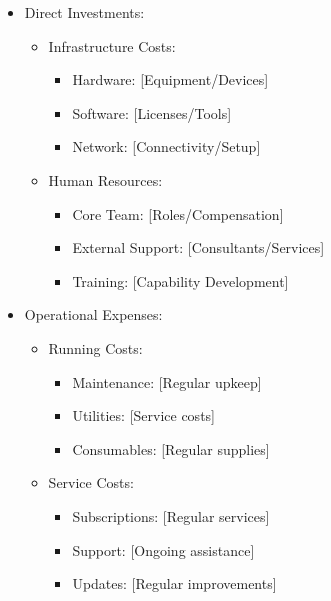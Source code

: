 \documentclass{article}
\begin{document}
\begin{itemize}
    \item Direct Investments:
    \begin{itemize}
        \item Infrastructure Costs:
        \begin{itemize}
            \item Hardware: [Equipment/Devices]
            \item Software: [Licenses/Tools]
            \item Network: [Connectivity/Setup]
        \end{itemize}
        \item Human Resources:
        \begin{itemize}
            \item Core Team: [Roles/Compensation]
            \item External Support: [Consultants/Services]
            \item Training: [Capability Development]
        \end{itemize}
    \end{itemize}
    \item Operational Expenses:
    \begin{itemize}
        \item Running Costs:
        \begin{itemize}
            \item Maintenance: [Regular upkeep]
            \item Utilities: [Service costs]
            \item Consumables: [Regular supplies]
        \end{itemize}
        \item Service Costs:
        \begin{itemize}
            \item Subscriptions: [Regular services]
            \item Support: [Ongoing assistance]
            \item Updates: [Regular improvements]
        \end{itemize}
    \end{itemize}
\end{itemize}
\end{document}
